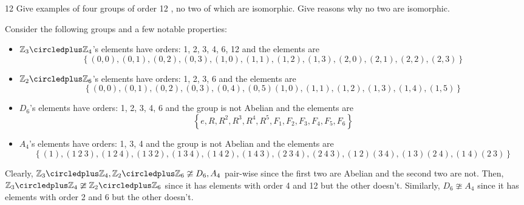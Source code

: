 \begin{hwproblem}
{12}{
    Give examples of four groups of order 12 , no two of which are isomorphic. Give reasons why no two are isomorphic.
}

Consider the following groups and a few notable properties:
\begin{itemize}
    \item \(\mathbb{Z}_3 \circledplus \mathbb{Z}_4\)'s elements have orders: 1, 2, 3, 4, 6, 12 and the elements are
        \[
            \left\{ (0, 0), (0, 1), (0, 2), (0, 3),
            (1, 0), (1, 1), (1, 2), (1, 3),
            (2, 0), (2, 1), (2, 2), (2, 3)\right\}
        \]
    \item \(\mathbb{Z}_{2} \circledplus \mathbb{Z}_{6}\)'s elements have orders: 1, 2, 3, 6 and the elements are
        \[
            \left\{(0, 0), (0, 1), (0, 2), (0, 3), (0, 4), (0, 5)
            (1, 0), (1, 1), (1, 2), (1, 3), (1, 4), (1, 5)\right\}
        \]
    \item \(D_6\)'s elements have orders: 1, 2, 3, 4, 6 and the group is not Abelian and the elements are
        \[
            \left\{e, R, R^2, R^3, R^4, R^5,
            F_1, F_2, F_3, F_4, F_5, F_6\right\}
        \]
    \item \(A_4\)'s elements have orders: 1, 3, 4 and the group is not Abelian and the elements are
        \[
            \left\{(1), (1\ 2\ 3), (1\ 2\ 4), (1\ 3\ 2), (1\ 3\ 4), (1\ 4\ 2), (1\ 4\ 3), (2\ 3\ 4), (2\ 4\ 3), (1\ 2)(3\ 4), (1\ 3)(2\ 4), (1\ 4)(2\ 3)\right\}
        \]
\end{itemize}

Clearly, \(\mathbb{Z}_3 \circledplus \mathbb{Z}_4, \mathbb{Z}_2 \circledplus \mathbb{Z}_6 \ncong D_6, A_4\) pair-wise since the first two are Abelian and the second two are not. Then, \(\mathbb{Z}_3 \circledplus \mathbb{Z}_4 \ncong \mathbb{Z}_2 \circledplus \mathbb{Z}_6\) since it has elements with order 4 and 12 but the other doesn't. Similarly, \(D_6 \ncong A_4\) since it has elements with order 2 and 6 but the other doesn't.
\end{hwproblem}
